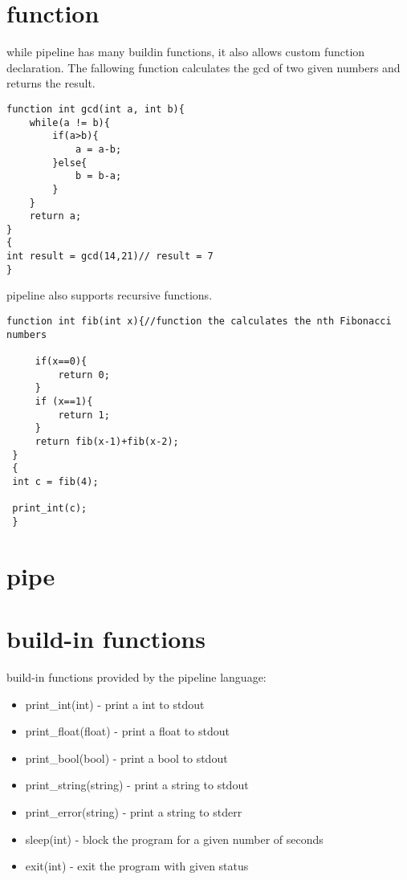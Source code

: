 \documentclass[./Report_main.tex]{subfiles}
\begin{document}
\section{function}
while pipeline has many buildin functions, it also allows custom function declaration. The fallowing function calculates the gcd of two given numbers and returns the result.\\
\begin{lstlisting}
function int gcd(int a, int b){
    while(a != b){
        if(a>b){
            a = a-b;
        }else{
            b = b-a;
        }
    }
    return a;
}
{
int result = gcd(14,21)// result = 7
}
\end{lstlisting}
pipeline also supports recursive functions.\\
\begin{lstlisting}
function int fib(int x){//function the calculates the nth Fibonacci numbers
 
     if(x==0){
         return 0;
     }
     if (x==1){
         return 1;
     }
     return fib(x-1)+fib(x-2);
 }
 {
 int c = fib(4);
 
 print_int(c);
 }
\end{lstlisting}
\section{pipe}
\section{build-in functions}
build-in functions provided by the pipeline language:\\
\begin{itemize}
    \item print\_int(int) - print a int to stdout
    \item print\_float(float) - print a float to stdout
    \item print\_bool(bool) - print a bool to stdout
    \item print\_string(string) - print a string to stdout
    \item print\_error(string) - print a string to stderr
    \item sleep(int) - block the program for a given number of seconds
    \item exit(int) - exit the program with given status
\end{itemize}
\end{document}
